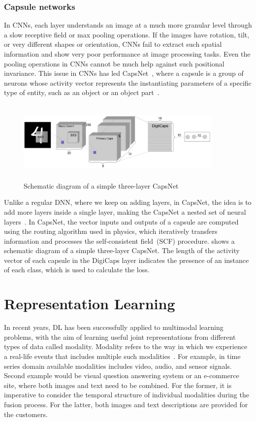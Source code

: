 \subsubsection{Capsule networks}
In CNNs, each layer understands an image at a much more granular level through a slow receptive field or max pooling operations. If the images have rotation, tilt, or very different shapes or orientation, CNNs fail to extract such spatial information and show very poor performance at image processing tasks. Even the pooling operations in CNNs cannot be much help against such positional invariance. This issue in CNNs has led CapsNet~\cite{CapsNet}, where a capsule is a group of neurons whose activity vector represents the instantiating parameters of a specific type of entity, such as an object or an object part~\cite{CapsNet}.

\begin{figure}[h]
    \centering
    \includegraphics[width=0.9\textwidth,height=40mm]{images/capsnet.png}
    \caption{Schematic diagram of a simple three-layer CapsNet~\cite{karimDLTF2018}}
    \label{fig:capsnet}
\end{figure}

\hspace*{3.5mm} Unlike a regular DNN, where we keep on adding layers, in CapsNet, the idea is to add more layers inside a single layer, making the CapsNet a nested set of neural layers~\cite{CapsNet}. In CapsNet, the vector inputs and outputs of a capsule are computed using the routing algorithm used in physics, which iteratively transfers information and processes the self-consistent field~(SCF) procedure.  shows a schematic diagram of a simple three-layer CapsNet. The length of the activity vector of each capsule in the DigiCaps layer indicates the presence of an instance of each class, which is used to calculate the loss. 
\fi 

\section{Representation Learning}
\label{sec:rep_learn} 
In recent years, DL has been successfully applied to multimodal learning problems, with the aim of learning useful joint representations from different types of data called modality. Modality refers to the way in which we experience a real-life events that includes multiple such modalities~\cite{mmsurvey}. For example, in time series domain available modalities includes video, audio, and sensor signals.
Second example would be visual question answering system or an e-commerce site, where both images and text need to be combined. For the former, it is imperative to consider the temporal structure of individual modalities during the fusion process. For the latter, both images and text descriptions are provided for the customers. 

